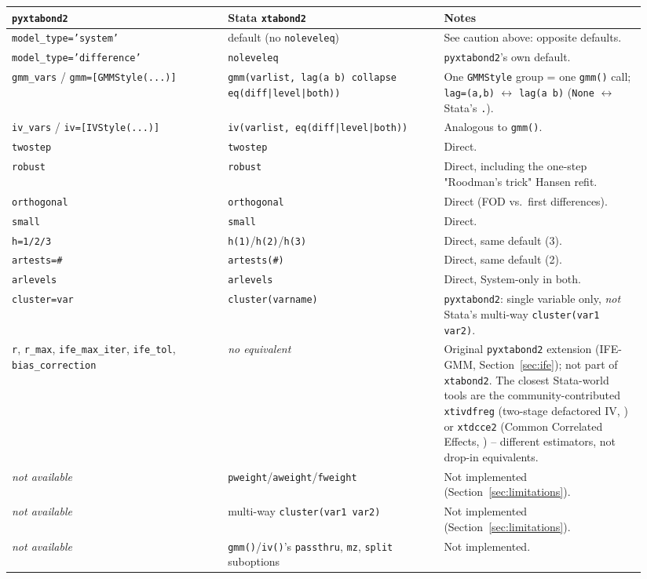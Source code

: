 \documentclass[11pt,a4paper]{article}
\newcommand{\pkg}{\texttt{pyxtabond2}}
\begin{document}
\begin{longtable}{@{}p{0.32\linewidth}p{0.32\linewidth}p{0.30\linewidth}@{}}
\toprule
\textbf{\pkg{}} & \textbf{Stata \texttt{xtabond2}} & \textbf{Notes} \\
\midrule
\endhead
\texttt{model\_type='system'} & default (no \texttt{noleveleq}) & See
  caution above: opposite defaults. \\
\texttt{model\_type='difference'} & \texttt{noleveleq} & \pkg{}'s own default. \\
\texttt{gmm\_vars} / \texttt{gmm=[GMMStyle(...)]} & \texttt{gmm(varlist,
  lag(a b) collapse eq(diff|level|both))} & One \texttt{GMMStyle} group = one
  \texttt{gmm()} call; \texttt{lag=(a,b)} $\leftrightarrow$ \texttt{lag(a b)}
  (\texttt{None} $\leftrightarrow$ Stata's \texttt{.}). \\
\texttt{iv\_vars} / \texttt{iv=[IVStyle(...)]} & \texttt{iv(varlist, eq(diff|level|both))} &
  Analogous to \texttt{gmm()}. \\
\texttt{twostep} & \texttt{twostep} & Direct. \\
\texttt{robust} & \texttt{robust} & Direct, including the one-step
  "Roodman's trick" Hansen refit. \\
\texttt{orthogonal} & \texttt{orthogonal} & Direct (FOD vs.\ first
  differences). \\
\texttt{small} & \texttt{small} & Direct. \\
\texttt{h=1/2/3} & \texttt{h(1)}/\texttt{h(2)}/\texttt{h(3)} & Direct, same
  default (3). \\
\texttt{artests=\#} & \texttt{artests(\#)} & Direct, same default (2). \\
\texttt{arlevels} & \texttt{arlevels} & Direct, System-only in both. \\
\texttt{cluster=var} & \texttt{cluster(varname)} & \pkg{}: single variable
  only, \emph{not} Stata's multi-way \texttt{cluster(var1 var2)}. \\
\texttt{r}, \texttt{r\_max}, \texttt{ife\_max\_iter}, \texttt{ife\_tol},
  \texttt{bias\_correction} & \emph{no equivalent} & Original \pkg{}
  extension (IFE-GMM, Section~\ref{sec:ife}); not part of \texttt{xtabond2}.
  The closest Stata-world tools are the community-contributed
  \texttt{xtivdfreg} (two-stage defactored IV,
  \citealp{KripfganzSarafidis2021, Norkute2021}) or \texttt{xtdcce2} (Common
  Correlated Effects, \citealp{Ditzen2018, Pesaran2006}) -- different
  estimators, not drop-in equivalents. \\
\emph{not available} & \texttt{pweight}/\texttt{aweight}/\texttt{fweight} &
  Not implemented (Section~\ref{sec:limitations}). \\
\emph{not available} & multi-way \texttt{cluster(var1 var2)} & Not
  implemented (Section~\ref{sec:limitations}). \\
\emph{not available} & \texttt{gmm()}/\texttt{iv()}'s \texttt{passthru},
  \texttt{mz}, \texttt{split} suboptions & Not implemented. \\
\bottomrule
\end{longtable}
\end{document}
